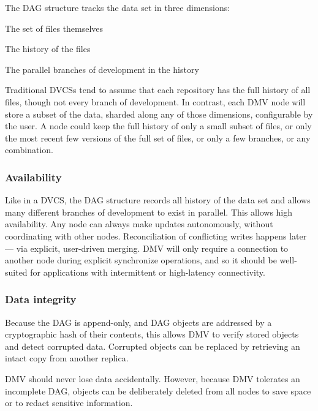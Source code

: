 The \gls{DAG} structure tracks the data set in three dimensions:

\begin{tight_enumerate}
    \item The set of files themselves
    \item The history of the files
    \item The parallel branches of development in the history
\end{tight_enumerate}

Traditional \glspl{DVCS} tend to assume that each repository has the full
history of all files, though not every branch of development. In contrast, each
\gls{DMV} node will store a subset of the data, sharded along any of those
dimensions, configurable by the user. A node could keep the full history of only
a small subset of files, or only the most recent few versions of the full set of
files, or only a few branches, or any combination.


\subsubsection{Availability}

Like in a \gls{DVCS}, the \gls{DAG} structure records all history of the data
set and allows many different branches of development to exist in parallel. This
allows high availability. Any node can always make updates autonomously, without
coordinating with other nodes. Reconciliation of conflicting writes happens
later --- via explicit, user-driven merging. \gls{DMV} will only require a
connection to another node during explicit synchronize operations, and so it
should be well-suited for applications with intermittent or high-latency
connectivity.


\subsubsection{Data integrity}

Because the \gls{DAG} is append-only, and \gls{DAG} objects are addressed by a
cryptographic hash of their contents, this allows \gls{DMV} to verify stored
objects and detect corrupted data. Corrupted objects can be replaced by
retrieving an intact copy from another replica.

\gls{DMV} should never lose data accidentally. However, because \gls{DMV}
tolerates an incomplete \gls{DAG}, objects can be deliberately deleted from all
nodes to save space or to redact sensitive information.


